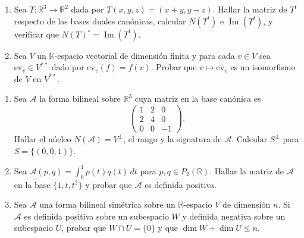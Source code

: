 \documentclass{article}
\newcommand{\R}{\mathbb{R}}
\newcommand{\K}{\mathbb{K}}
\DeclareMathOperator{\Ima}{Im}
\newcommand{\A}{\mathcal{A}}
\newenvironment{ejercicio}[1]{\begin{trivlist}
\item[\hskip \labelsep {\bfseries #1.}]}{\end{trivlist}}
\begin{document}
\begin{ejercicio}{4}
    \begin{enumerate}
        \item Sea \( T: \R^3 \to \R^2 \) dada por \( T(x, y, z) = (x + y, y - z) \). Hallar la matriz de \( T^t \) respecto de las bases duales canónicas, calcular \( N(T^t) \) e \( \Ima(T^t) \), y verificar que \( N(T)^\circ = \Ima(T^t) \).
        \item Sea \( V \) un \( \K \)-espacio vectorial de dimensión finita y para cada \( v \in V \) sea \( \mathrm{ev}_v \in V^{**} \) dado por \( \mathrm{ev}_v(f) = f(v) \). Probar que \( v \mapsto \mathrm{ev}_v \) es un isomorfismo de \( V \) en \( V^{**} \).
    \end{enumerate}
\end{ejercicio}

\begin{ejercicio}{5}
    \begin{enumerate}
        \item Sea \( \A \) la forma bilineal sobre \( \R^3 \) cuya matriz en la base canónica es
              \[ \begin{pmatrix} 1 & 2 & 0 \\ 2 & 4 & 0 \\ 0 & 0 & -1 \end{pmatrix}. \]
              Hallar el núcleo \( N(\A) = V^\perp \), el rango y la signatura de \( \A \). Calcular \( S^\perp \) para \( S = \{(0, 0, 1)\} \).
        \item Sea \( \A(p, q) = \int_0^1 p(t) q(t) \, dt \) para \( p, q \in P_2(\R) \). Hallar la matriz de \( \A \) en la base \( \{1, t, t^2\} \) y probar que \( \A \) es definida positiva.
        \item Sea \( \A \) una forma bilineal simétrica sobre un \( \R \)-espacio \( V \) de dimensión \( n \). Si \( \A \) es definida positiva sobre un subespacio \( W \) y definida negativa sobre un subespacio \( U \), probar que \( W \cap U = \{0\} \) y que \( \dim W + \dim U \le n \).
    \end{enumerate}
\end{ejercicio}
\end{document}
